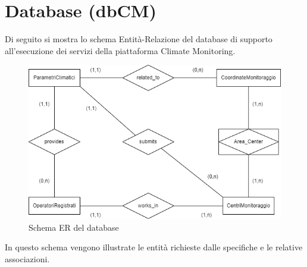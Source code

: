 \chapter{Database (dbCM)}
\label{ch:db}
Di seguito si mostra lo schema Entità-Relazione del database di supporto all’esecuzione dei servizi della piattaforma Climate Monitoring.

\begin{figure}[h]
	\centering
	\caption{Schema ER del database}
	\label{fig:erdb}
	\includegraphics[width=0.8\linewidth]{../../fig/img/tecnico/ERdb.drawio}
\end{figure}

In questo schema vengono illustrate le entità richieste dalle specifiche e le relative associazioni.

